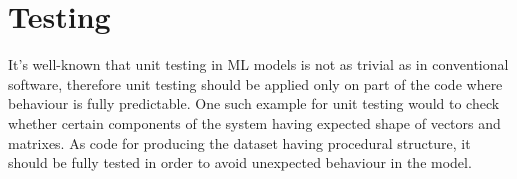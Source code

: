 {\section{Testing}
It's well-known that unit testing in ML models is not as trivial as in conventional software,
therefore unit testing should be applied only on part of the code where
behaviour is fully predictable. One such example for unit testing would to check whether
certain components of the system having expected shape of vectors and matrixes.
As code for producing the dataset having procedural structure,
it should be fully tested in order to avoid
unexpected behaviour in the model.


%
%








%
%





}
